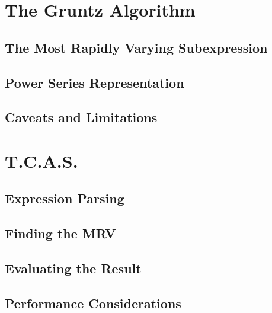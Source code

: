 \documentclass{article}
\theoremstyle{plain}
\theoremstyle{definition}
\begin{document}
	\section{The Gruntz Algorithm}
	
	\subsection{The Most Rapidly Varying Subexpression}
	
	\subsection{Power Series Representation}
	
	\subsection{Caveats and Limitations}
	
	\section{T.C.A.S.}
	
	\subsection{Expression Parsing}
	
	\subsection{Finding the MRV}
	
	\subsection{Evaluating the Result}
	
	\subsection{Performance Considerations}
	
	\printbibliography
	
\end{document}
